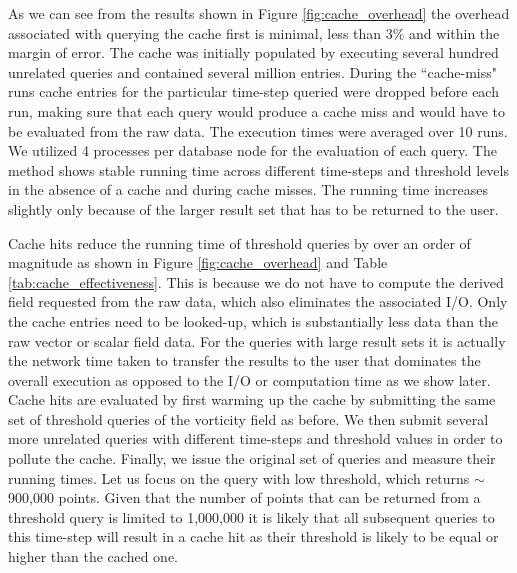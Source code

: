 \documentclass{sig-alternate}
\begin{document}
As we can see from the results shown in Figure \ref{fig:cache_overhead} the overhead associated with querying the cache first is minimal, 
less than 3\% and within the margin of error.
The cache was initially populated by executing several hundred unrelated queries and contained several million entries.
During the ``cache-miss" runs cache entries for the particular time-step queried were dropped before each run, making sure that each query would
produce a cache miss and would have to be evaluated from the raw data. 
The execution times were averaged over 10 runs.
We utilized 4 processes per database node for the evaluation of each query. 
The method shows stable running time across different time-steps and threshold levels in the absence of a cache and during cache misses.
The running time increases slightly only because of the larger result set that has to be returned to the user.

Cache hits reduce the running time of threshold queries by over an order of magnitude as shown in Figure \ref{fig:cache_overhead} and
Table \ref{tab:cache_effectiveness}. This is because we do not have to compute the derived
field requested from the raw data, which also eliminates the associated I/O. Only the cache entries need to be looked-up, which is substantially less data
than the raw vector or scalar field data. For the queries with large result sets it is actually the network time taken to transfer the results to the user that 
dominates the overall execution as opposed to the I/O or computation time as we show later.
Cache hits are evaluated by first warming up the cache by submitting the same set of threshold queries of the vorticity field as before. We then submit
several more unrelated queries with different time-steps and threshold values in order to pollute the cache. Finally, we issue the original set of queries and 
measure their running times. Let us focus on the query
with low threshold, which returns $\sim$900,000 points. Given that the number of points that can be returned from a threshold query is limited to 1,000,000
it is likely that all subsequent queries to this time-step will result in a cache hit as their threshold is likely to be equal or higher than the cached one.
\end{document}
